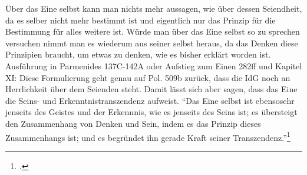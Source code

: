 Über das Eine selbst kann man nichts mehr aussagen, wie über dessen Seiendheit, da es selber nicht mehr bestimmt ist und eigentlich nur das Prinzip für die Bestimmung für alles weitere ist. Würde man über das Eine selbst so zu sprechen versuchen nimmt man es wiederum aus seiner selbst heraus, da das Denken diese Prinzipien braucht, um etwas zu denken, wie es bisher erklärt worden ist. Ausführung in Parmenides 137C-142A oder Aufstieg zum Einen 282ff und Kapitel XI:
Diese Formulierung geht genau auf Pol. 509b zurück, dass die IdG noch an Herrlichkeit über dem Seienden steht. 
Damit lässt sich aber sagen, dass das Eine die Seins- und Erkenntnistranszendenz aufweist. \enquote{Das Eine selbst ist ebensosehr jenseits des Geistes und der Erkennnis, wie es jenseits des Seins ist; es übersteigt den Zusammenhang von Denken und Sein, indem es das Prinzip dieses Zusammenhangs ist; und es begründet ihn gerade Kraft seiner Transzendenz.}\footcite[][S. 102]{halfwassen2015spuren}
